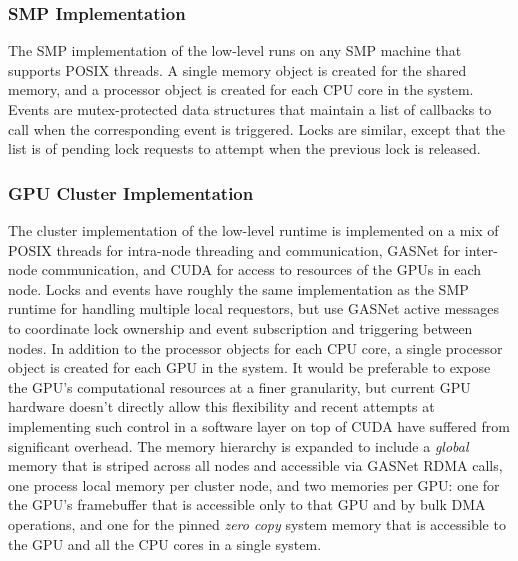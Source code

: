 \subsubsection{SMP Implementation}
\label{subsec:smpimpl}
The SMP implementation of the low-level runs on any SMP machine that supports 
POSIX threads.  A single memory object is created for the shared memory, and 
a processor object is created for
each CPU core in the system.  Events are 
mutex-protected data structures that maintain a list of callbacks to call when
the corresponding event is triggered.  Locks are similar, except that the list
is of pending lock requests to attempt when the previous lock is released.

\subsubsection{GPU Cluster Implementation}
\label{subsec:clusterimpl}
The cluster implementation of the low-level runtime is implemented on a mix
of POSIX threads for intra-node threading and communication, GASNet for 
inter-node communication, and CUDA for access to resources of the GPUs in 
each node.  Locks and events have roughly the same implementation as the SMP
runtime for handling multiple local requestors, but use GASNet active messages
to coordinate lock ownership and event subscription and triggering between
nodes.  In addition to the processor objects for each CPU core, a single
processor object is created for each GPU in the system.  It would be preferable
to expose the GPU's computational resources at a finer granularity, but
current GPU hardware doesn't directly allow this flexibility and recent attempts
at implementing such control in a software layer on top of CUDA have suffered
from significant overhead.  The memory hierarchy is expanded to include a 
{\em global} memory that is striped across all nodes and accessible via GASNet
RDMA calls, one process local memory per cluster node, and two memories per GPU: one for the GPU's framebuffer that is
accessible only to that GPU and by bulk DMA operations, and one for the pinned
{\em zero copy} system memory that is accessible to the GPU and all the CPU cores
in a single system.
